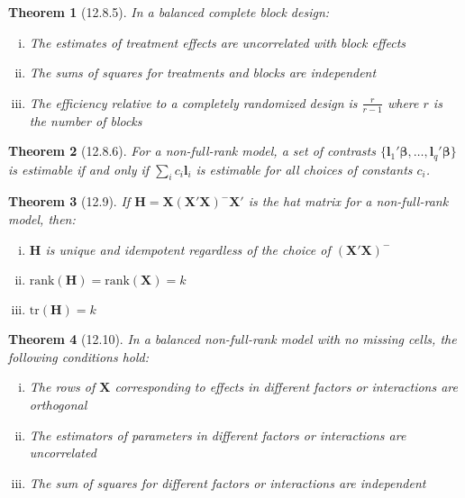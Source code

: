 \documentclass{article}
\newtheorem{theorem}{Theorem}[section]
\begin{document}
\begin{theorem}[12.8.5]
In a balanced complete block design:
\begin{enumerate}[(i)]
\item The estimates of treatment effects are uncorrelated with block effects
\item The sums of squares for treatments and blocks are independent
\item The efficiency relative to a completely randomized design is $\frac{r}{r-1}$ where $r$ is the number of blocks
\end{enumerate}
\end{theorem}

\begin{theorem}[12.8.6]
For a non-full-rank model, a set of contrasts $\{\mathbf{l}_1'\boldsymbol{\beta}, \ldots, \mathbf{l}_q'\boldsymbol{\beta}\}$ is estimable if and only if $\sum_i c_i\mathbf{l}_i$ is estimable for all choices of constants $c_i$.
\end{theorem}


\begin{theorem}[12.9]
If $\mathbf{H} = \mathbf{X}(\mathbf{X}'\mathbf{X})^{-}\mathbf{X}'$ is the hat matrix for a non-full-rank model, then:
\begin{enumerate}[(i)]
\item $\mathbf{H}$ is unique and idempotent regardless of the choice of $(\mathbf{X}'\mathbf{X})^{-}$
\item $\text{rank}(\mathbf{H}) = \text{rank}(\mathbf{X}) = k$
\item $\text{tr}(\mathbf{H}) = k$
\end{enumerate}
\end{theorem}

\begin{theorem}[12.10]
In a balanced non-full-rank model with no missing cells, the following conditions hold:
\begin{enumerate}[(i)]
\item The rows of $\mathbf{X}$ corresponding to effects in different factors or interactions are orthogonal
\item The estimators of parameters in different factors or interactions are uncorrelated
\item The sum of squares for different factors or interactions are independent
\end{enumerate}
\end{theorem}
\end{document}
